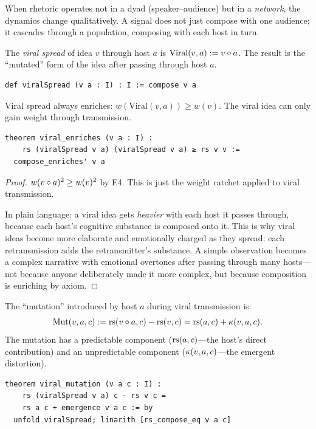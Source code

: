 When rhetoric operates not in a dyad (speaker--audience) but in a
\emph{network}, the dynamics change qualitatively.  A signal does not just
compose with one audience; it cascades through a population, composing with
each host in turn.

\begin{definition}
\label{def:viral-spread}
The \emph{viral spread} of idea $v$ through host $a$ is
$\text{Viral}(v, a) := v \circ a$.  The result is the ``mutated'' form
of the idea after passing through host $a$.

\begin{lstlisting}[caption={Lean 4: Viral spread}]
def viralSpread (v a : I) : I := compose v a
\end{lstlisting}
\end{definition}

\begin{theorem}
\label{thm:viral-enrichment}
Viral spread always enriches: $w(\text{Viral}(v, a)) \geq w(v)$.
The viral idea can only gain weight through transmission.

\begin{lstlisting}[caption={Lean 4: Viral enriches}]
theorem viral_enriches (v a : I) :
    rs (viralSpread v a) (viralSpread v a) ≥ rs v v :=
  compose_enriches' v a
\end{lstlisting}
\end{theorem}

\begin{proof}
$w(v \circ a)^2 \geq w(v)^2$ by E4.  This is just the weight ratchet
applied to viral transmission.

In plain language: a viral idea gets \emph{heavier} with each host it passes
through, because each host's cognitive substance is composed onto it.  This
is why viral ideas become more elaborate and emotionally charged as they
spread: each retransmission adds the retransmitter's substance.  A simple
observation becomes a complex narrative with emotional overtones after
passing through many hosts---not because anyone deliberately made it more
complex, but because composition is enriching by axiom.
\end{proof}

\begin{theorem}
\label{thm:viral-mutation}
The ``mutation'' introduced by host $a$ during viral transmission is:
\[
  \text{Mut}(v, a, c) := \mathrm{rs}(v \circ a, c) - \mathrm{rs}(v, c) = \mathrm{rs}(a, c) +
  \kappa(v, a, c).
\]
The mutation has a predictable component ($\mathrm{rs}(a, c)$---the host's direct
contribution) and an unpredictable component ($\kappa(v, a, c)$---the
emergent distortion).

\begin{lstlisting}[caption={Lean 4: Viral mutation}]
theorem viral_mutation (v a c : I) :
    rs (viralSpread v a) c - rs v c =
    rs a c + emergence v a c := by
  unfold viralSpread; linarith [rs_compose_eq v a c]
\end{lstlisting}
\end{theorem}

